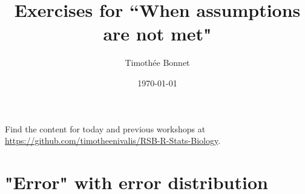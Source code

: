 \documentclass[12pt,a4paper]{scrartcl}\usepackage[]{graphicx}\usepackage[]{color}
\title{Exercises for ``When assumptions are not met"}
\date{\today}
\author{Timoth\'ee Bonnet}
\begin{document}
\maketitle

Find the content for today and previous workshops at \href{https://github.com/timotheenivalis/RSB-R-Stats-Biology}{https://github.com/timotheenivalis/RSB-R-Stats-Biology}.

\tableofcontents
\ListOfExerciseInToc
{}

\clearpage 



\section{"Error" with error distribution}
\end{document}
